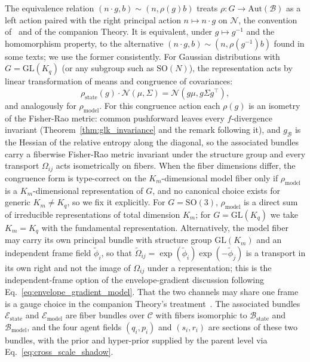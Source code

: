 \documentclass[11pt]{article}
\begin{document}
The equivalence relation $(n\cdot g, b) \sim (n, \rho(g)b)$ treats $\rho: G \to \mathrm{Aut}(\mathcal{B})$ as a left action paired with the right principal action $n \mapsto n\cdot g$ on $\mathcal{N}$, the convention of~\cite{Nakahara2003} and of the companion Theory. It is equivalent, under $g \mapsto g^{-1}$ and the homomorphism property, to the alternative $(n\cdot g, b) \sim (n, \rho(g^{-1})b)$ found in some texts; we use the former consistently. For Gaussian distributions with $G = \mathrm{GL}(K_q)$ (or any subgroup such as $\mathrm{SO}(N)$), the representation acts by linear transformation of means and congruence of covariances:
\begin{equation}
\rho_{\mathrm{state}}(g) \cdot \mathcal{N}(\mu, \Sigma) = \mathcal{N}(g\mu, g\Sigma g^\top),
\end{equation}
and analogously for $\rho_{\mathrm{model}}$. For this congruence action each $\rho(g)$ is an isometry of the Fisher-Rao metric: common pushforward leaves every $f$-divergence invariant (Theorem~\ref{thm:glk_invariance} and the remark following it), and $g_{\mathcal{B}}$ is the Hessian of the relative entropy along the diagonal, so the associated bundles carry a fiberwise Fisher-Rao metric invariant under the structure group and every transport $\Omega_{ij}$ acts isometrically on fibers. When the fiber dimensions differ, the congruence form is type-correct on the $K_m$-dimensional model fiber only if $\rho_{\mathrm{model}}$ is a $K_m$-dimensional representation of $G$, and no canonical choice exists for generic $K_m \neq K_q$, so we fix it explicitly. For $G = \mathrm{SO}(3)$, $\rho_{\mathrm{model}}$ is a direct sum of irreducible representations of total dimension $K_m$; for $G = \mathrm{GL}(K_q)$ we take $K_m = K_q$ with the fundamental representation. Alternatively, the model fiber may carry its own principal bundle with structure group $\mathrm{GL}(K_m)$ and an independent frame field $\tilde{\phi}_i$, so that $\tilde{\Omega}_{ij} = \exp(\tilde{\phi}_i)\exp(-\tilde{\phi}_j)$ is a transport in its own right and not the image of $\Omega_{ij}$ under a representation; this is the independent-frame option of the envelope-gradient discussion following Eq.~\eqref{eq:envelope_gradient_model}. That the two channels may share one frame is a gauge choice in the companion Theory's treatment~\cite[Ch.~2]{DennisGaugeVFE2026}. The associated bundles $\mathcal{E}_{\mathrm{state}}$ and $\mathcal{E}_{\mathrm{model}}$ are fiber bundles over $\mathcal{C}$ with fibers isomorphic to $\mathcal{B}_{\mathrm{state}}$ and $\mathcal{B}_{\mathrm{model}}$, and the four agent fields $(q_i, p_i)$ and $(s_i, r_i)$ are sections of these two bundles, with the prior and hyper-prior supplied by the parent level via Eq.~\eqref{eq:cross_scale_shadow}.
\end{document}
